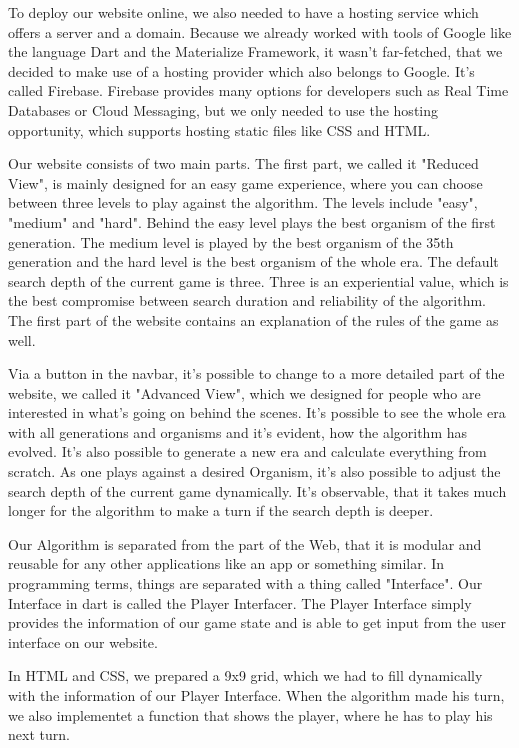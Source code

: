To deploy our website online, we also needed to have a hosting service which offers a server and a domain. Because we already worked with tools of Google like the language Dart and the Materialize Framework, it wasn't far-fetched, that we decided to make use of a hosting provider which also belongs to Google. It's called Firebase. Firebase provides many options for developers such as Real Time Databases or Cloud Messaging, but we only needed to use the hosting opportunity, which supports hosting static files like CSS and HTML.

Our website consists of two main parts. The first part, we called it "Reduced View", is mainly designed for an easy game experience, where you can choose between three levels to play against the algorithm. The levels include "easy", "medium" and "hard". Behind the easy level plays the best organism of the first generation. 
The medium level is played by the best organism of the 35th %
generation and the hard level is the best organism of the whole era. The default search depth of the current game is three. Three is an experiential value, which is the best compromise between search duration and reliability of the algorithm.
The first part of the website contains an explanation of the rules of the game as well.

Via a button in the navbar, it's possible to change to a more detailed  part of the website, we called it "Advanced View", which we designed for people who are interested in what's going on behind the scenes. It's possible to see the whole era with all generations and organisms and it's evident, how the algorithm has evolved. It's also possible to generate a new era and calculate everything from scratch. As one plays against a desired Organism, it's also possible to adjust the search depth of the current game dynamically. It's observable, that it takes much longer for the algorithm to make a turn if the search depth is deeper. %

Our Algorithm is separated from the part of the Web, that it is modular and reusable for any other applications like an app or something similar. In programming terms, things are separated with a thing called "Interface". Our Interface in dart is called the Player Interfacer. The Player Interface simply provides the information of our game state and is able to get input from the user interface on our website.

In HTML and CSS, we prepared a 9x9 grid, which we had to fill dynamically with the information of our Player Interface. When the algorithm made his turn, we also implementet a function that shows the player, where he has to play his next turn. 


